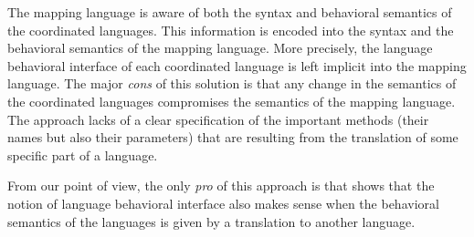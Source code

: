 The mapping language is aware of both the syntax and behavioral semantics of the coordinated languages. This information is encoded into the syntax and the behavioral semantics of the mapping language. More precisely, the language behavioral interface of each coordinated language is left implicit into the mapping language. The major \emph{cons} of this solution is that any change in the semantics of the coordinated languages compromises the semantics of the mapping language. The approach lacks of a clear specification of the important methods (their names but also their parameters) that are resulting from the translation of some specific part of a language. 

From our point of view, the only \emph{pro} of this approach is that shows that the notion of language behavioral interface also makes sense when the behavioral semantics of the languages is given by a translation to another language.

 
